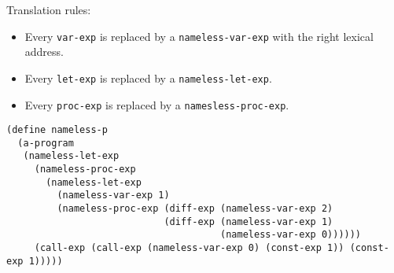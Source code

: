 \documentclass[../main.tex]{subfiles}
\begin{document}
Translation rules:
\begin{itemize}
    \item Every \texttt{var-exp} is replaced by a \texttt{nameless-var-exp} with the right lexical address.
    \item Every \texttt{let-exp} is replaced by a \texttt{nameless-let-exp}.
    \item Every \texttt{proc-exp} is replaced by a \texttt{namesless-proc-exp}.
\end{itemize}

\begin{lstlisting}
(define nameless-p
  (a-program
   (nameless-let-exp
     (nameless-proc-exp
       (nameless-let-exp
         (nameless-var-exp 1)
         (nameless-proc-exp (diff-exp (nameless-var-exp 2)
                            (diff-exp (nameless-var-exp 1)
                                      (nameless-var-exp 0))))))
     (call-exp (call-exp (nameless-var-exp 0) (const-exp 1)) (const-exp 1)))))
\end{lstlisting}
\end{document}
